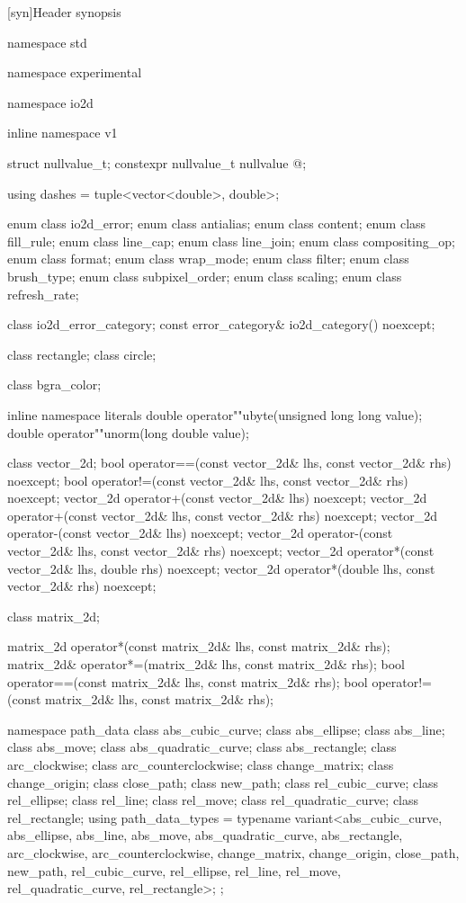 [syn]{Header  synopsis}

%
\begin{codeblock}

namespace std { namespace experimental {
  namespace io2d { inline namespace v1 {

  struct nullvalue_t;
  constexpr nullvalue_t nullvalue{ @\impdef@ };

  using dashes = tuple<vector<double>, double>;

  enum class io2d_error;
  enum class antialias;
  enum class content;
  enum class fill_rule;
  enum class line_cap;
  enum class line_join;
  enum class compositing_op;
  enum class format;
  enum class wrap_mode;
  enum class filter;
  enum class brush_type;
  enum class subpixel_order;
  enum class scaling;
  enum class refresh_rate;

  class io2d_error_category;
  const error_category& io2d_category() noexcept;

  class rectangle;
  class circle;

  class bgra_color;

  inline namespace literals {
    double operator""ubyte(unsigned long long value);
    double operator""unorm(long double value);
  }
  
  class vector_2d;
  bool operator==(const vector_2d& lhs, const vector_2d& rhs) noexcept;
  bool operator!=(const vector_2d& lhs, const vector_2d& rhs) noexcept;
  vector_2d operator+(const vector_2d& lhs) noexcept;
  vector_2d operator+(const vector_2d& lhs, const vector_2d& rhs) noexcept;
  vector_2d operator-(const vector_2d& lhs) noexcept;
  vector_2d operator-(const vector_2d& lhs, const vector_2d& rhs) noexcept;
  vector_2d operator*(const vector_2d& lhs, double rhs) noexcept;
  vector_2d operator*(double lhs, const vector_2d& rhs) noexcept;

  class matrix_2d;

  matrix_2d operator*(const matrix_2d& lhs, const matrix_2d& rhs);
  matrix_2d& operator*=(matrix_2d& lhs, const matrix_2d& rhs);
  bool operator==(const matrix_2d& lhs, const matrix_2d& rhs);
  bool operator!=(const matrix_2d& lhs, const matrix_2d& rhs);

  namespace path_data {
    class abs_cubic_curve;
    class abs_ellipse;
    class abs_line;
    class abs_move;
    class abs_quadratic_curve;
    class abs_rectangle;
    class arc_clockwise;
    class arc_counterclockwise;
    class change_matrix;
    class change_origin;
    class close_path;
    class new_path;
    class rel_cubic_curve;
    class rel_ellipse;
    class rel_line;
    class rel_move;
    class rel_quadratic_curve;
    class rel_rectangle;
    using path_data_types = typename variant<abs_cubic_curve, abs_ellipse, 
      abs_line, abs_move, abs_quadratic_curve, abs_rectangle, arc_clockwise,
      arc_counterclockwise, change_matrix, change_origin, close_path, new_path,
      rel_cubic_curve, rel_ellipse, rel_line, rel_move, rel_quadratic_curve, rel_rectangle>;
  };
  
}}}}
\end{codeblock}
